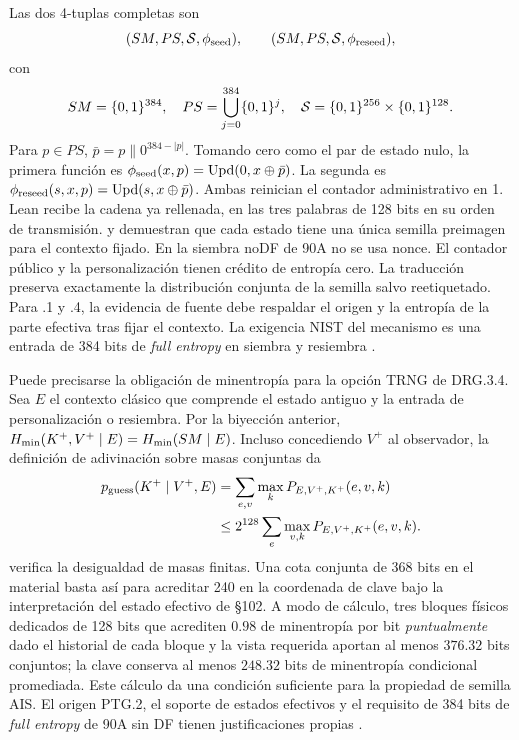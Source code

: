 Las dos 4-tuplas completas son
\[
 (SM,PS,\mathcal S,\phi_{\rm seed}),\qquad
 (SM,PS,\mathcal S,\phi_{\rm reseed}),
\]
con
\[
 SM=\{0,1\}^{384},\quad
 PS=\bigcup_{j=0}^{384}\{0,1\}^j,\quad
 \mathcal S=\{0,1\}^{256}\times\{0,1\}^{128}.
\]
Para \(p\in PS\), \(\bar p=p\|0^{384-|p|}\). Tomando cero como el par
de estado nulo, la primera función es
\(\phi_{\rm seed}(x,p)=\mathrm{Upd}(0,x\oplus\bar p)\).
La segunda es
\(\phi_{\rm reseed}(s,x,p)=\mathrm{Upd}(s,x\oplus\bar p)\).
Ambas reinician el contador administrativo en 1. Lean recibe la cadena ya
rellenada, en las tres palabras de 128 bits en su orden de transmisión.
 y  demuestran
que cada estado tiene una única semilla preimagen para el contexto fijado.
En la siembra noDF de 90A no se usa nonce. El contador público y la
personalización tienen crédito de entropía cero. La traducción preserva
exactamente la distribución conjunta de la semilla salvo reetiquetado.
Para .1 y .4, la evidencia de fuente debe respaldar el origen y la entropía
de la parte efectiva tras fijar el contexto. La exigencia NIST del mecanismo
es una entrada de 384 bits de \emph{full entropy} en siembra y resiembra
\cite[§§143, 147 y 205--207]{ais}\cite[§§10.2.1.3.1 y 10.2.1.4.1]{nist90a}.

Puede precisarse la obligación de minentropía para la opción TRNG de
DRG.3.4. Sea \(E\) el contexto clásico que comprende el estado antiguo y
la entrada de personalización o resiembra. Por la biyección anterior,
\(H_{\min}(K^+,V^+\mid E)=H_{\min}(SM\mid E)\). Incluso concediendo \(V^+\)
al observador, la definición de adivinación sobre masas conjuntas da
\[
\begin{aligned}
  p_{\mathrm{guess}}(K^+\mid V^+,E)
    &=\sum_{e,v}\max_k P_{E,V^+,K^+}(e,v,k)\\
    &\le 2^{128}\sum_e\max_{v,k}P_{E,V^+,K^+}(e,v,k).
\end{aligned}
\]
 verifica la
desigualdad de masas finitas. Una cota conjunta de 368 bits en el material basta así para acreditar 240
en la coordenada de clave bajo la interpretación del estado efectivo de §102.
A modo de cálculo, tres bloques físicos dedicados de 128 bits que acrediten
\(0.98\) de minentropía por bit \emph{puntualmente} dado el historial de cada
bloque y la vista requerida aportan al menos \(376.32\) bits conjuntos;
la clave conserva al menos \(248.32\) bits de minentropía condicional
promediada. Este cálculo da una condición suficiente para la propiedad
de semilla AIS. El origen PTG.2, el soporte de estados efectivos y el
requisito de 384 bits de \emph{full entropy} de 90A sin DF tienen
justificaciones propias \cite[§§102,207,1074--1075]{ais}.


